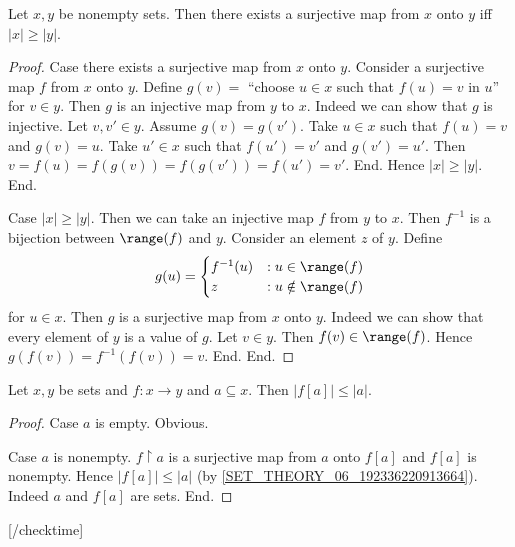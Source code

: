 \documentclass[../set-theory.tex]{subfiles}
\begin{document}
  \begin{forthel}
    \begin{proposition}
      Let $x, y$ be nonempty sets.
      Then there exists a surjective map from $x$ onto $y$ iff $|x| \geq |y|$.
    \end{proposition}
    \begin{proof}
      Case there exists a surjective map from $x$ onto $y$.
        Consider a surjective map $f$ from $x$ onto $y$.
        Define $g(v) =$ ``choose $u \in x$ such that $f(u) = v$ in $u$'' for
        $v \in y$.
        Then $g$ is an injective map from $y$ to $x$.
        Indeed we can show that $g$ is injective.
          Let $v, v' \in y$.
          Assume $g(v) = g(v')$.
          Take $u \in x$ such that $f(u) = v$ and $g(v) = u$.
          Take $u' \in x$ such that $f(u') = v'$ and $g(v') = u'$.
          Then $v
            = f(u)
            = f(g(v))
            = f(g(v'))
            = f(u')
            = v'$.
        End.
        Hence $|x| \geq |y|$.
      End.

      Case $|x| \geq |y|$.
        Then we can take an injective map $f$ from $y$ to $x$.
        Then $f^{-1}$ is a bijection between $\range(f)$ and $y$.
        Consider an element $z$ of $y$.
        Define \[ g(u) =
          \begin{cases}
            f^{-1}(u) & : u \in \range(f) \\
            z         & : u \notin \range(f)
          \end{cases} \]
        for $u \in x$.
        Then $g$ is a surjective map from $x$ onto $y$.
        Indeed we can show that every element of $y$ is a value of $g$.
          Let $v \in y$.
          Then $f(v) \in \range(f)$.
          Hence $g(f(v)) = f^{-1}(f(v)) = v$.
        End.
      End.
    \end{proof}
  \end{forthel}

  \begin{forthel}
    [checktime 2]

    \begin{proposition}
      Let $x, y$ be sets and $f : x \to y$ and $a \subseteq x$.
      Then $|f[a]| \leq |a|$.
    \end{proposition}
    \begin{proof}
      Case $a$ is empty. Obvious.

      Case $a$ is nonempty.
        $f \restriction a$ is a surjective map from $a$ onto $f[a]$ and $f[a]$
        is nonempty.
        Hence $|f[a]| \leq |a|$ (by \cref{SET_THEORY_06_192336220913664}).
        Indeed $a$ and $f[a]$ are sets.
      End.
    \end{proof}

    [/checktime]
  \end{forthel}
\end{document}

